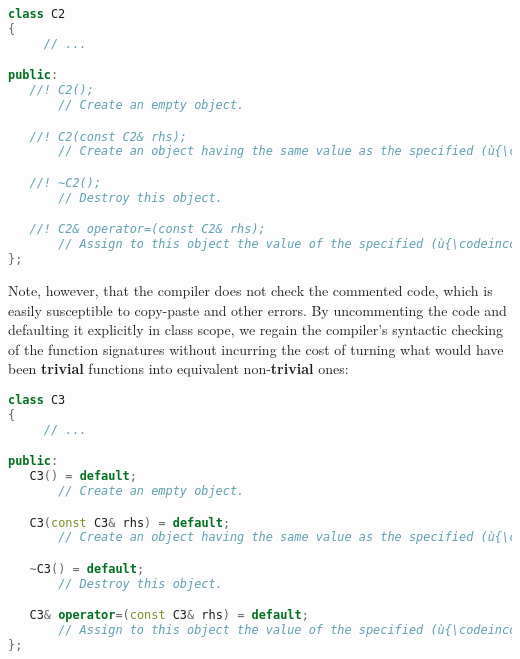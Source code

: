 \begin{lstlisting}[language=C++]
class C2
{
     // ...

public:
   //! C2();
       // Create an empty object.

   //! C2(const C2& rhs);
       // Create an object having the same value as the specified (ù{\codeincomments{rhs}}ù) object.

   //! ~C2();
       // Destroy this object.

   //! C2& operator=(const C2& rhs);
       // Assign to this object the value of the specified (ù{\codeincomments{rhs}}ù) object.
};
\end{lstlisting}

\noindent Note, however, that the compiler does not check the commented code, which is easily susceptible to copy-paste and other errors. By
uncommenting the code and defaulting it explicitly in class scope, we
regain the compiler's syntactic checking of the function signatures
without incurring the cost of turning what would have been
\textbf{trivial} functions into equivalent
non-\textbf{trivial} ones:

\begin{lstlisting}[language=C++]
class C3
{
     // ...

public:
   C3() = default;
       // Create an empty object.

   C3(const C3& rhs) = default;
       // Create an object having the same value as the specified (ù{\codeincomments{rhs}}ù) object.

   ~C3() = default;
       // Destroy this object.

   C3& operator=(const C3& rhs) = default;
       // Assign to this object the value of the specified (ù{\codeincomments{rhs}}ù) object.
};
\end{lstlisting}


